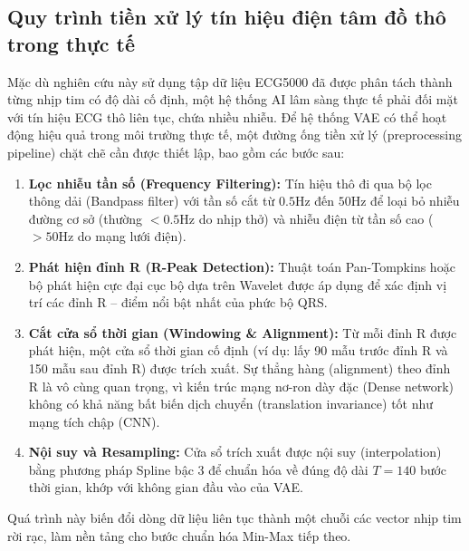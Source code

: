 \documentclass[conference]{IEEEtran}
\begin{document}
\subsection{Quy trình tiền xử lý tín hiệu điện tâm đồ thô trong thực tế}
Mặc dù nghiên cứu này sử dụng tập dữ liệu ECG5000 đã được phân tách thành từng nhịp tim có độ dài cố định, một hệ thống AI lâm sàng thực tế phải đối mặt với tín hiệu ECG thô liên tục, chứa nhiều nhiễu. Để hệ thống VAE có thể hoạt động hiệu quả trong môi trường thực tế, một đường ống tiền xử lý (preprocessing pipeline) chặt chẽ cần được thiết lập, bao gồm các bước sau:
\begin{enumerate}
    \item \textbf{Lọc nhiễu tần số (Frequency Filtering):} Tín hiệu thô đi qua bộ lọc thông dải (Bandpass filter) với tần số cắt từ $0.5\text{Hz}$ đến $50\text{Hz}$ để loại bỏ nhiễu đường cơ sở (thường $<0.5\text{Hz}$ do nhịp thở) và nhiễu điện từ tần số cao ($>50\text{Hz}$ do mạng lưới điện).
    \item \textbf{Phát hiện đỉnh R (R-Peak Detection):} Thuật toán Pan-Tompkins \cite{pan_tompkins} hoặc bộ phát hiện cực đại cục bộ dựa trên Wavelet được áp dụng để xác định vị trí các đỉnh R -- điểm nổi bật nhất của phức bộ QRS.
    \item \textbf{Cắt cửa sổ thời gian (Windowing \& Alignment):} Từ mỗi đỉnh R được phát hiện, một cửa sổ thời gian cố định (ví dụ: lấy 90 mẫu trước đỉnh R và 150 mẫu sau đỉnh R) được trích xuất. Sự thẳng hàng (alignment) theo đỉnh R là vô cùng quan trọng, vì kiến trúc mạng nơ-ron dày đặc (Dense network) không có khả năng bất biến dịch chuyển (translation invariance) tốt như mạng tích chập (CNN).
    \item \textbf{Nội suy và Resampling:} Cửa sổ trích xuất được nội suy (interpolation) bằng phương pháp Spline bậc 3 để chuẩn hóa về đúng độ dài $T=140$ bước thời gian, khớp với không gian đầu vào của VAE.
\end{enumerate}
Quá trình này biến đổi dòng dữ liệu liên tục thành một chuỗi các vector nhịp tim rời rạc, làm nền tảng cho bước chuẩn hóa Min-Max tiếp theo.
\end{document}
